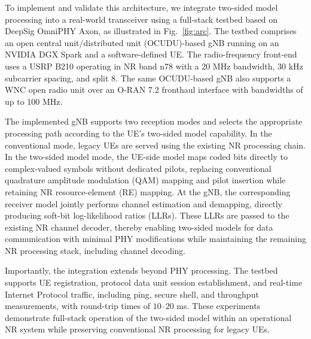 \documentclass[10pt,twocolumn]{IEEEtran}
\begin{document}
To implement and validate this architecture, we integrate two-sided model processing into a real-world transceiver using a full-stack testbed based on DeepSig OmniPHY Axon, as illustrated in Fig.~\ref{fig:arc}. The testbed comprises an open central unit/distributed unit (OCUDU)-based gNB \cite{ocudu2025} running on an NVIDIA DGX Spark and a software-defined UE. The radio-frequency front-end uses a USRP B210 operating in NR band n78 with a 20 MHz bandwidth, 30 kHz subcarrier spacing, and split 8. The same OCUDU-based gNB also supports a WNC open radio unit over an O-RAN 7.2 fronthaul interface with bandwidths of up to 100 MHz. 




The implemented gNB supports two reception modes and selects the appropriate processing path according to the UE's two-sided model capability. In the conventional mode, legacy UEs are served using the existing NR processing chain. In the two-sided model mode, the UE-side model maps coded bits directly to complex-valued symbols without dedicated pilots, replacing conventional quadrature amplitude modulation (QAM) mapping and pilot insertion while retaining NR resource-element (RE) mapping. At the gNB, the corresponding receiver model jointly performs channel estimation and demapping, directly producing soft-bit log-likelihood ratios (LLRs). These LLRs are passed to the existing NR channel decoder, thereby enabling two-sided models for data communication with minimal PHY modifications while maintaining the remaining NR processing stack, including channel decoding.

Importantly, the integration extends beyond PHY processing. The testbed supports UE registration, protocol data unit session establishment, and real-time Internet Protocol traffic, including ping, secure shell, and throughput measurements, with round-trip times of $10$--$20$ ms. These experiments demonstrate full-stack operation of the two-sided model within an operational NR system while preserving conventional NR processing for legacy UEs.
\end{document}

